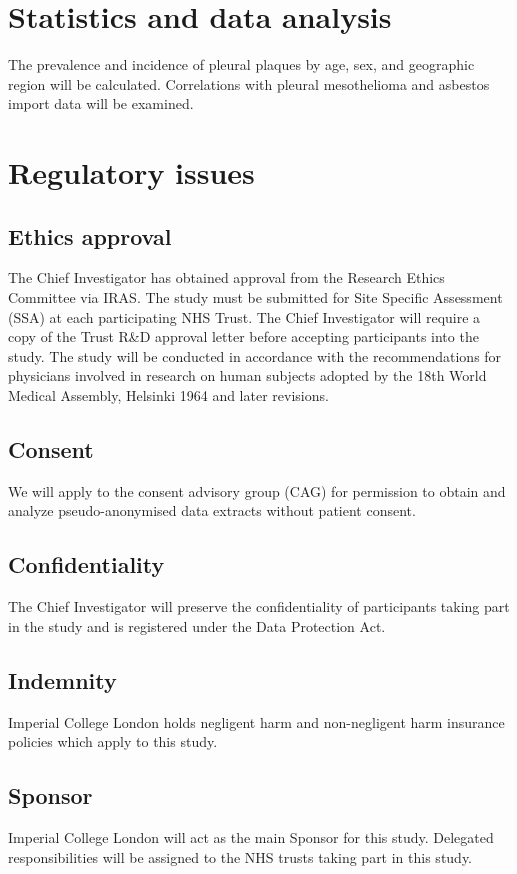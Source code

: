\documentclass[a4paper,10pt]{article}
\begin{document}
\section{Statistics and data analysis}
The prevalence and incidence of pleural plaques by age, sex, and geographic region will be calculated. Correlations with pleural mesothelioma and asbestos import data will be examined.

\section{Regulatory issues}

\subsection{Ethics approval}
The Chief Investigator has obtained approval from the Research Ethics Committee via IRAS\@. The study must be submitted for Site Specific Assessment (SSA) at each participating NHS Trust. The Chief Investigator will require a copy of the Trust R\&D approval letter before accepting participants into the study. The study will be conducted in accordance with the recommendations for physicians involved in research on human subjects adopted by the 18th World Medical Assembly, Helsinki 1964 and later revisions.


\subsection{Consent}
We will apply to the consent advisory group (CAG) for permission to obtain and analyze pseudo-anonymised data extracts without patient consent.

\subsection{Confidentiality}
The Chief Investigator will preserve the confidentiality of participants taking part in the study and is registered under the Data Protection Act.

\subsection{Indemnity}
Imperial College London holds negligent harm and non-negligent harm insurance policies which apply to this study.

\subsection{Sponsor}
Imperial College London will act as the main Sponsor for this study. Delegated responsibilities will be assigned to the NHS trusts taking part in this study.  
\end{document}

